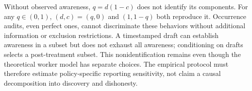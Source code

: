 \documentclass[
  11pt,
]{article}
\begin{document}
Without observed awareness, \(q=d(1-c)\) does not identify its
components. For any \(q\in(0,1)\), \((d,c)=(q,0)\) and \((1,1-q)\) both
reproduce it. Occurrence audits, even perfect ones, cannot discriminate
these behaviors without additional information or exclusion
restrictions. A timestamped draft can establish awareness in a subset
but does not exhaust all awareness; conditioning on drafts selects a
post-treatment subset. This nonidentification remains even though the
theoretical worker model has separate choices. The empirical protocol
must therefore estimate policy-specific reporting sensitivity, not claim
a causal decomposition into discovery and dishonesty.
\end{document}
